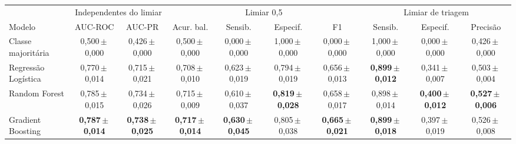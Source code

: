 \begin{tabular}{@{}lccccccccc@{}}
\toprule
 & \multicolumn{2}{c}{Independentes do limiar} & \multicolumn{4}{c}{Limiar 0{,}5} & \multicolumn{3}{c}{Limiar de triagem} \\
\cmidrule(lr){2-3}\cmidrule(lr){4-7}\cmidrule(l){8-10}
Modelo & AUC-ROC & AUC-PR & Acur. bal. & Sensib. & Especif. & F1 & Sensib. & Especif. & Precisão \\
\midrule
Classe majoritária & 0{,}500\,$\pm$\,0{,}000 & 0{,}426\,$\pm$\,0{,}000 & 0{,}500\,$\pm$\,0{,}000 & 0{,}000\,$\pm$\,0{,}000 & 1{,}000\,$\pm$\,0{,}000 & 0{,}000\,$\pm$\,0{,}000 & 1{,}000\,$\pm$\,0{,}000 & 0{,}000\,$\pm$\,0{,}000 & 0{,}426\,$\pm$\,0{,}000 \\
Regressão Logística & 0{,}770\,$\pm$\,0{,}014 & 0{,}715\,$\pm$\,0{,}021 & 0{,}708\,$\pm$\,0{,}010 & 0{,}623\,$\pm$\,0{,}019 & 0{,}794\,$\pm$\,0{,}019 & 0{,}656\,$\pm$\,0{,}013 & \textbf{0{,}899\,$\pm$\,0{,}012} & 0{,}341\,$\pm$\,0{,}007 & 0{,}503\,$\pm$\,0{,}004 \\
Random Forest & 0{,}785\,$\pm$\,0{,}015 & 0{,}734\,$\pm$\,0{,}026 & 0{,}715\,$\pm$\,0{,}009 & 0{,}610\,$\pm$\,0{,}037 & \textbf{0{,}819\,$\pm$\,0{,}028} & 0{,}658\,$\pm$\,0{,}017 & 0{,}898\,$\pm$\,0{,}014 & \textbf{0{,}400\,$\pm$\,0{,}012} & \textbf{0{,}527\,$\pm$\,0{,}006} \\
Gradient Boosting & \textbf{0{,}787\,$\pm$\,0{,}014} & \textbf{0{,}738\,$\pm$\,0{,}025} & \textbf{0{,}717\,$\pm$\,0{,}014} & \textbf{0{,}630\,$\pm$\,0{,}045} & 0{,}805\,$\pm$\,0{,}038 & \textbf{0{,}665\,$\pm$\,0{,}021} & \textbf{0{,}899\,$\pm$\,0{,}018} & 0{,}397\,$\pm$\,0{,}019 & 0{,}526\,$\pm$\,0{,}008 \\
\bottomrule
\end{tabular}
